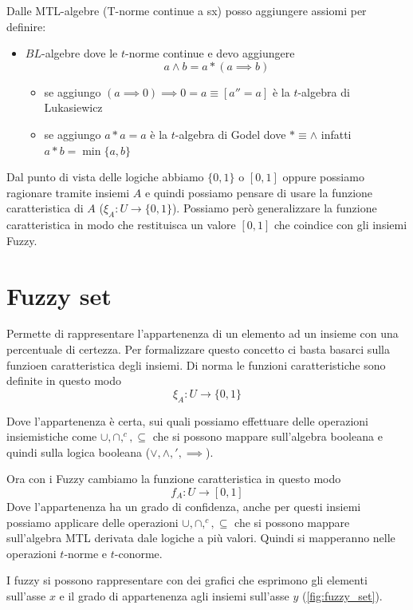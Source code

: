 Dalle MTL-algebre (T-norme continue a sx) posso aggiungere assiomi per definire:
\begin{itemize}
    \item $BL$-algebre dove le $t$-norme continue e devo aggiungere 
    $$a\land b = a\ast (a\implies b)$$
    \begin{itemize}
        \item se aggiungo $(a\implies 0 )\implies 0 = a\equiv [a''=a]$ è la $t$-algebra di Lukasiewicz 
        \item se aggiungo $a\ast a  = a$ è la $t$-algebra di Godel dove $\ast \equiv \land $ infatti $a\ast b = \min \{a,b\}$ 
    \end{itemize}
\end{itemize}

Dal punto di vista delle logiche abbiamo $\{0,1\}$ o $[0,1]$
oppure possiamo ragionare tramite insiemi $A$ e quindi possiamo pensare di usare la funzione
caratteristica di $A$ ($\xi_A: U \to \{0,1\}$).
Possiamo però generalizzare la funzione caratteristica in modo che restituisca un
valore $[0,1]$ che coindice con gli insiemi Fuzzy.

\section{Fuzzy set}
Permette di rappresentare l'appartenenza di un elemento ad un insieme con una 
percentuale di certezza. Per formalizzare questo concetto ci basta basarci sulla 
funzioen caratteristica degli insiemi. Di norma le funzioni caratteristiche sono 
definite in questo modo 
$$\xi_A: U \to \{0,1\}$$

Dove l'appartenenza è certa, sui quali possiamo effettuare delle operazioni insiemistiche 
come $\cup, \cap, ^c, \subseteq$ che si possono mappare sull'algebra booleana e quindi sulla 
logica booleana ($\lor, \land, ', \implies$).

Ora con i Fuzzy cambiamo la funzione caratteristica in questo modo
$$f_A: U \to [0,1]$$
Dove l'appartenenza ha un grado di confidenza, anche per questi insiemi possiamo 
applicare delle operazioni $\cup, \cap, ^c, \subseteq$ che si possono mappare 
sull'algebra MTL derivata dale logiche a più valori. Quindi si mapperanno nelle 
operazioni $t$-norme e $t$-conorme.

I fuzzy si possono rappresentare con dei grafici che esprimono gli elementi sull'asse 
$x$ e il grado di appartenenza agli insiemi sull'asse $y$ (\ref{fig:fuzzy_set}).

